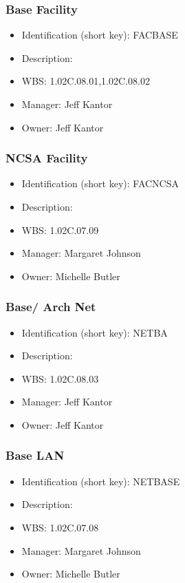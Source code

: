 \subsubsection{Base Facility}\label{sect:FACBASE}
\begin{itemize}
\item Identification (short key): FACBASE
\item Description: 
\item WBS: 1.02C.08.01,1.02C.08.02
\item Manager: Jeff Kantor
\item Owner: Jeff Kantor
\end{itemize}

\subsubsection{NCSA Facility}\label{sect:FACNCSA}
\begin{itemize}
\item Identification (short key): FACNCSA
\item Description: 
\item WBS: 1.02C.07.09
\item Manager: Margaret Johnson
\item Owner: Michelle Butler
\end{itemize}

\subsubsection{Base/ Arch Net}\label{sect:NETBA}
\begin{itemize}
\item Identification (short key): NETBA
\item Description: 
\item WBS: 1.02C.08.03
\item Manager: Jeff Kantor
\item Owner: Jeff Kantor
\end{itemize}

\subsubsection{Base LAN}\label{sect:NETBASE}
\begin{itemize}
\item Identification (short key): NETBASE
\item Description: 
\item WBS: 1.02C.07.08
\item Manager: Margaret Johnson
\item Owner: Michelle Butler
\end{itemize}

